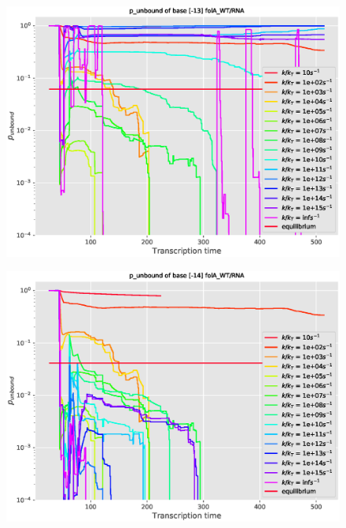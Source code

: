 \documentclass[11pt, a4paper]{article}
\begin{document}
\begin{figure}
\centering
\includegraphics[width=\linewidth]{p_unbound/RNA_p_unbound_base[-13]_k_tuning}
\caption{}
\label{fig:RNA_p_unbound_base[-13]_k_tuning}
\end{figure}
\begin{figure}
\centering
\includegraphics[width=\linewidth]{p_unbound/RNA_p_unbound_base[-14]_k_tuning}
\caption{}
\label{fig:RNA_p_unbound_base[-14]_k_tuning}
\end{figure}


\end{document}
